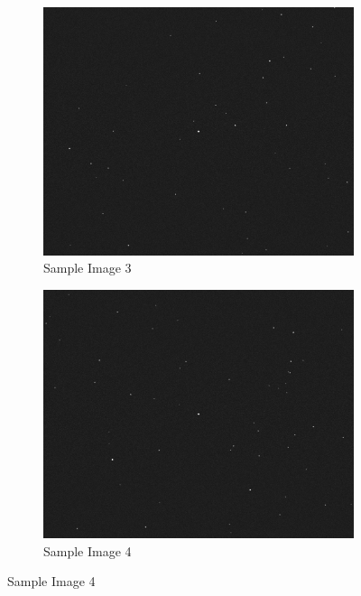 \documentclass[../../main.tex]{subfiles}
\begin{document}
\begin{figure}[h!]
\begin{subfigure}[b]{0.45\textwidth}
    \end{subfigure}
    \\
    \begin{subfigure}[b]{0.45\textwidth}
        \centering
        \includegraphics[width=\textwidth]{Figures/Model/Sample Images/Image_3.png}
        \caption{Sample Image 3}
        \label{fig:sample_3}
    \end{subfigure}
    \hfill
    \begin{subfigure}[b]{0.45\textwidth}
         \centering
         \includegraphics[width=\textwidth]{Figures/Model/Sample Images/Image_4.png}
         \caption{Sample Image 4}

\end{subfigure}
\end{figure}
\end{document}
